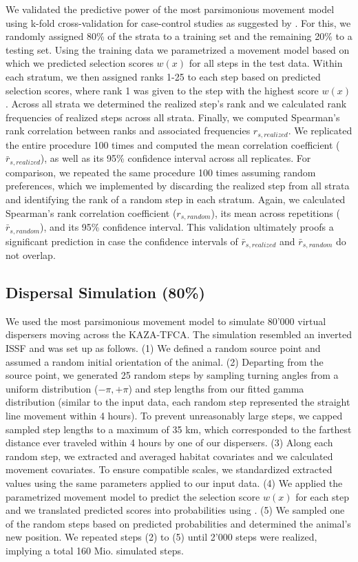 \documentclass[abstract=on,10pt,a4paper,bibliography=totocnumbered]{article}
\begin{document}
We validated the predictive power of the most parsimonious movement model using
k-fold cross-validation for case-control studies as suggested by
\cite{Fortin.2009}. For this, we randomly assigned 80\% of the strata to a
training set and the remaining 20\% to a testing set. Using the training data we
parametrized a movement model based on which we predicted selection scores
\(w(x)\) for all steps in the test data. Within each stratum, we then assigned
ranks 1-25 to each step based on predicted selection scores, where rank 1 was
given to the step with the highest score \(w(x)\). Across all strata we
determined the realized step's rank and we calculated rank frequencies of
realized steps across all strata. Finally, we computed Spearman's rank
correlation between ranks and associated frequencies \(r_{s, realized}\). We
replicated the entire procedure 100 times and computed the mean correlation
coefficient (\(\bar{r}_{s, realized}\)), as well as its 95\% confidence interval
across all replicates. For comparison, we repeated the same procedure 100 times
assuming random preferences, which we implemented by discarding the realized
step from all strata and identifying the rank of a random step in each stratum.
Again, we calculated Spearman's rank correlation coefficient (\(r_{s,
random}\)), its mean across repetitions (\(\bar{r}_{s, random}\)), and its 95\%
confidence interval. This validation ultimately proofs a significant prediction
in case the confidence intervals of \(\bar{r}_{s, realized}\) and \(\bar{r}_{s,
random}\) do not overlap.

\subsection{Dispersal Simulation (80\%)}
We used the most parsimonious movement model to simulate 80'000 virtual
dispersers moving across the KAZA-TFCA. The simulation resembled an inverted
ISSF and was set up as follows. (1) We defined a random source point and assumed
a random initial orientation of the animal. (2) Departing from the source point,
we generated 25 random steps by sampling turning angles from a uniform
distribution (\(-\pi, +\pi\)) and step lengths from our fitted gamma
distribution (similar to the input data, each random step represented the
straight line movement within 4 hours). To prevent unreasonably large steps, we
capped sampled step lengths to a maximum of 35 km, which corresponded to the
farthest distance ever traveled within 4 hours by one of our dispersers. (3)
Along each random step, we extracted and averaged habitat covariates and we
calculated movement covariates. To ensure compatible scales, we standardized
extracted values using the same parameters applied to our input data. (4) We
applied the parametrized movement model to predict the selection score \(w(x)\)
for each step and we translated predicted scores into probabilities using
. (5) We sampled one of the random steps based on predicted
probabilities and determined the animal's new position. We repeated steps (2) to
(5) until 2'000 steps were realized, implying a total 160 Mio. simulated steps.
\end{document}
